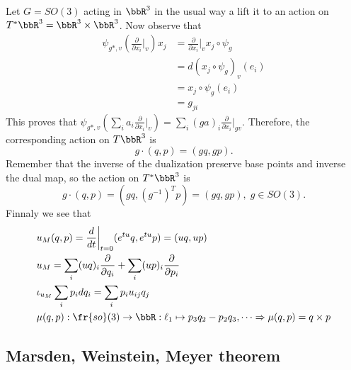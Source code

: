 \begin{example}
    Let $G=SO(3)$ acting in $\bbR^3$ in the usual way a lift it to an action on $T^*\bbR^3=\bbR^3\times\bbR^3$. 
    Now observe that 
    \begin{equation}
    \begin{split}
    \psi_{g*,v}(\frac{\partial}{\partial x_i}\bigg|_v)x_j&=\frac{\partial}{\partial x_i}\bigg|_vx_j\circ \psi_g \\
    &=d(x_j\circ \psi_g)_v(e_i)\\
    &=x_j \circ\psi_g(e_i)\\
    &=g_{ji}
    \end{split}
    \end{equation}
    This proves that $\psi_{g*,v}(\sum_ia_i\frac{\partial}{\partial x_i}\bigg|_v)
    =\sum_i(ga)_i\frac{\partial}{\partial x_i}\bigg|_{gv}$. Therefore, the corresponding action on $T\bbR^3$ is 
    \begin{equation}
        g\cdot(q,p)=(gq,gp).
    \end{equation}
    Remember that the inverse of the dualization preserve base points and inverse the dual map, so the action on 
    $T^*\bbR^3$ is 
    \begin{equation}
        g\cdot (q,p)=(gq,(g^{-1})^Tp)=(gq,gp),\;g\in SO(3).
    \end{equation}
    Finnaly we see that 
    \begin{equation}
        \begin{aligned}
            &u_M(q,p)=\frac{d}{dt}\bigg|_{t=0}(e^{tu}q,e^{tu}p)=(uq,up)\\
            &u_M = \sum_i (uq)_i\frac{\partial}{\partial q_i}+\sum_i (up)_i\frac{\partial}{\partial p_i}\\
            &\iota_{u_M}\sum_ip_idq_i = \sum_i p_iu_{ij}q_j\\
            &\mu(q,p):\fr{so}(3)\to \bbR: \ell_1\mapsto p_3q_2-p_2q_3,\dots\Rightarrow \mu(q,p)=q\times p
        \end{aligned}
    \end{equation}
\end{example}
\subsection{Marsden, Weinstein, Meyer theorem}